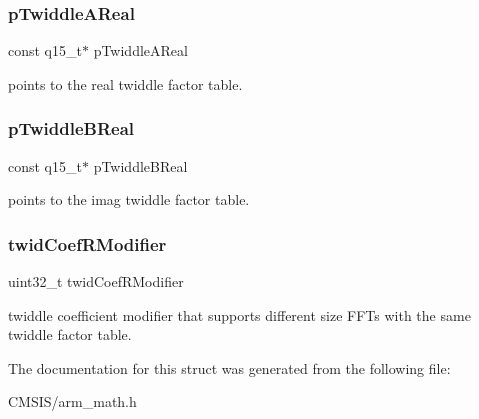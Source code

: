 \subsubsection{\texorpdfstring{pTwiddleAReal}{pTwiddleAReal}}
{\footnotesize\ttfamily const q15\+\_\+t$\ast$ p\+Twiddle\+A\+Real}

points to the real twiddle factor table. \mbox{\label{structarm__rfft__instance__q15_a19474a01d3d1784e3447c140d8c30f19}} 
\subsubsection{\texorpdfstring{pTwiddleBReal}{pTwiddleBReal}}
{\footnotesize\ttfamily const q15\+\_\+t$\ast$ p\+Twiddle\+B\+Real}

points to the imag twiddle factor table. \mbox{\label{structarm__rfft__instance__q15_a5b06f7f76c018db993fe6acc5708c589}} 
\subsubsection{\texorpdfstring{twidCoefRModifier}{twidCoefRModifier}}
{\footnotesize\ttfamily uint32\+\_\+t twid\+Coef\+R\+Modifier}

twiddle coefficient modifier that supports different size F\+F\+Ts with the same twiddle factor table. 

The documentation for this struct was generated from the following file\+:\begin{DoxyCompactItemize}
\item 
C\+M\+S\+I\+S/arm\+\_\+math.\+h\end{DoxyCompactItemize}

